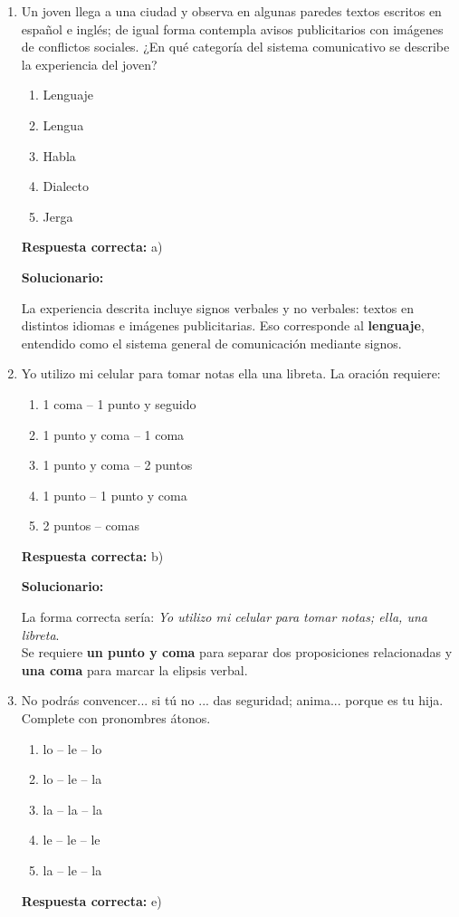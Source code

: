 \begin{enumerate}[resume]
	
	\item Un joven llega a una ciudad y observa en algunas paredes textos escritos en español e inglés; de igual forma contempla avisos publicitarios con imágenes de conflictos sociales. ¿En qué categoría del sistema comunicativo se describe la experiencia del joven?
	\begin{enumerate}[label=\alph*)]
		\item Lenguaje
		\item Lengua
		\item Habla
		\item Dialecto
		\item Jerga
	\end{enumerate}
	\textbf{Respuesta correcta:} a)
	
	\vspace{2mm}
	\textbf{Solucionario:}
	
	La experiencia descrita incluye signos verbales y no verbales: textos en distintos idiomas e imágenes publicitarias. Eso corresponde al \textbf{lenguaje}, entendido como el sistema general de comunicación mediante signos.
	
	\vspace{6mm}
	
	\item Yo utilizo mi celular para tomar notas ella una libreta. La oración requiere:
	\begin{enumerate}[label=\alph*)]
		\item 1 coma -- 1 punto y seguido
		\item 1 punto y coma -- 1 coma
		\item 1 punto y coma -- 2 puntos
		\item 1 punto -- 1 punto y coma
		\item 2 puntos -- comas
	\end{enumerate}
	\textbf{Respuesta correcta:} b)
	
	\vspace{2mm}
	\textbf{Solucionario:}
	
	La forma correcta sería: \textit{Yo utilizo mi celular para tomar notas; ella, una libreta}.\\
	Se requiere \textbf{un punto y coma} para separar dos proposiciones relacionadas y \textbf{una coma} para marcar la elipsis verbal.
	
	\vspace{6mm}
	
	\item No podrás convencer... si tú no ... das seguridad; anima... porque es tu hija. Complete con pronombres átonos.
	\begin{enumerate}[label=\alph*)]
		\item lo -- le -- lo
		\item lo -- le -- la
		\item la -- la -- la
		\item le -- le -- le
		\item la -- le -- la
	\end{enumerate}
	\textbf{Respuesta correcta:} e)
	

\end{enumerate}
